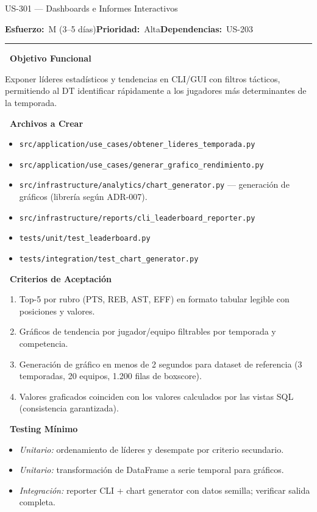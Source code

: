 \documentclass[11pt,a4paper]{article}
\newcommand{\fpath}[1]{\texttt{\small #1}}
\newcommand{\usfield}[2][\;]{%
  \par\vspace{5pt}%
  {\small\textbf{\textcolor{primary}{#2}}}\par\vspace{2pt}%
}
\newcommand{\usmeta}[3]{%
  \vspace{2pt}%
  {\small\textcolor{secondary}{%
    \textbf{Esfuerzo:}~#1\quad\textbf{Prioridad:}~#2\quad\textbf{Dependencias:}~#3%
  }}%
  \par\vspace{4pt}%
  \textcolor{bordergray}{\rule{\linewidth}{0.4pt}}\par\vspace{4pt}%
}
\begin{document}
\begin{uscard}{US-301 — Dashboards e Informes Interactivos}

\usmeta{M (3–5 días)}{Alta}{US-203}

\usfield{\faAlignLeft\ Objetivo Funcional}
Exponer líderes estadísticos y tendencias en CLI/GUI con filtros tácticos, permitiendo al DT identificar rápidamente a los jugadores más determinantes de la temporada.

\usfield{\faFolderOpen\ Archivos a Crear}
\begin{itemize}[nosep, leftmargin=1.6em]
  \item \fpath{src/application/use\_cases/obtener\_lideres\_temporada.py}
  \item \fpath{src/application/use\_cases/generar\_grafico\_rendimiento.py}
  \item \fpath{src/infrastructure/analytics/chart\_generator.py} — generación de gráficos (librería según ADR-007).
  \item \fpath{src/infrastructure/reports/cli\_leaderboard\_reporter.py}
  \item \fpath{tests/unit/test\_leaderboard.py}
  \item \fpath{tests/integration/test\_chart\_generator.py}
\end{itemize}

\usfield{\faCheckCircle\ Criterios de Aceptación}
\begin{enumerate}[label=\textcolor{accent}{\textbf{AC\arabic*.}}, nosep, leftmargin=2.2em]
  \item Top-5 por rubro (PTS, REB, AST, EFF) en formato tabular legible con posiciones y valores.
  \item Gráficos de tendencia por jugador/equipo filtrables por temporada y competencia.
  \item Generación de gráfico en menos de 2 segundos para dataset de referencia (3 temporadas, 20 equipos, 1.200 filas de boxscore).
  \item Valores graficados coinciden con los valores calculados por las vistas SQL (consistencia garantizada).
\end{enumerate}

\usfield{\faFlask\ Testing Mínimo}
\begin{itemize}[nosep, leftmargin=1.6em]
  \item \textit{Unitario:} ordenamiento de líderes y desempate por criterio secundario.
  \item \textit{Unitario:} transformación de DataFrame a serie temporal para gráficos.
  \item \textit{Integración:} reporter CLI + chart generator con datos semilla; verificar salida completa.
\end{itemize}

\end{uscard}
\end{document}
